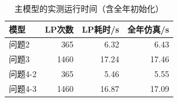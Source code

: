 \begin{table}[H]
\centering\small
\caption{主模型的实测运行时间（含全年初始化）}
\label{tab:runtime}
\begin{tabular}{lrrr}\toprule
模型 & LP次数 & LP耗时/s & 全年仿真/s \\\midrule
问题2 & 365 & 6.32 & 6.43 \\
问题3 & 1460 & 17.24 & 17.46 \\
问题4-2 & 365 & 5.46 & 5.55 \\
问题4-3 & 1460 & 16.87 & 17.09 \\
\bottomrule\end{tabular}
\end{table}
